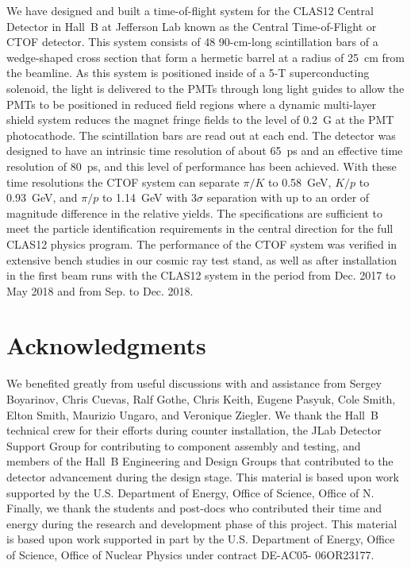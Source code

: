 \documentclass[3p,times,twocolumn]{elsarticle}
\begin{document}
We have designed and built a time-of-flight system for the CLAS12 Central Detector in Hall~B 
at Jefferson Lab known as the Central Time-of-Flight or CTOF detector. This system consists 
of 48 90-cm-long scintillation bars of a wedge-shaped cross section that form a hermetic barrel
at a radius of 25~cm from the beamline. As this system is positioned inside of a 5-T superconducting
solenoid, the light is delivered to the PMTs through long light guides to allow the PMTs to be positioned
in reduced field regions where a dynamic multi-layer shield system reduces the magnet fringe fields to
the level of 0.2~G at the PMT photocathode. The scintillation bars are read out at each end. The
detector was designed to have an intrinsic time resolution of about 65~ps and an effective time resolution
of 80~ps, and this level of performance has been achieved. With these time resolutions the CTOF system
can separate $\pi/K$ to 0.58~GeV, $K/p$ to 0.93~GeV, and $\pi/p$ to 1.14~GeV with 3$\sigma$
separation with up to an order of magnitude difference in the relative yields.  The specifications are
sufficient to meet the particle identification requirements in the central direction for the full CLAS12
physics program. The performance of the CTOF system was verified in extensive bench studies in our
cosmic ray test stand, as well as after installation in the first beam runs with the CLAS12 system in the
period from Dec. 2017 to May 2018 and from Sep. to Dec. 2018. 

\section*{Acknowledgments}

We benefited greatly from useful discussions with and assistance from Sergey Boyarinov, Chris
Cuevas, Ralf Gothe, Chris Keith, Eugene Pasyuk, Cole Smith, Elton Smith, Maurizio Ungaro, and
Veronique Ziegler. We thank the Hall~B technical crew for their efforts during counter installation,
the JLab Detector Support Group for contributing to component assembly and testing, and members of
the Hall~B Engineering and Design Groups that contributed to the detector advancement during the
design stage. This material is based upon work supported by the U.S. Department of Energy, Office of
Science, Office of N. Finally, we thank the students and post-docs who contributed their time and energy
during the research and development phase of this project. This material is based upon work supported in
part by the U.S. Department of Energy, Office of Science, Office of Nuclear Physics under contract
DE-AC05- 06OR23177.
\end{document}
